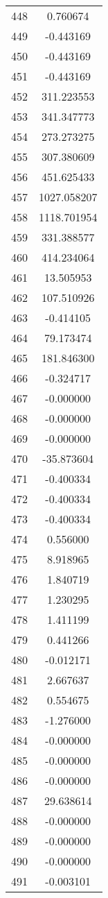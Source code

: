 \documentclass[12pt]{article}
\begin{document}
\begin{longtable}{@{}cc@{}}
448 & 0.760674 \\
449 & -0.443169 \\
450 & -0.443169 \\
451 & -0.443169 \\
452 & 311.223553 \\
453 & 341.347773 \\
454 & 273.273275 \\
455 & 307.380609 \\
456 & 451.625433 \\
457 & 1027.058207 \\
458 & 1118.701954 \\
459 & 331.388577 \\
460 & 414.234064 \\
461 & 13.505953 \\
462 & 107.510926 \\
463 & -0.414105 \\
464 & 79.173474 \\
465 & 181.846300 \\
466 & -0.324717 \\
467 & -0.000000 \\
468 & -0.000000 \\
469 & -0.000000 \\
470 & -35.873604 \\
471 & -0.400334 \\
472 & -0.400334 \\
473 & -0.400334 \\
474 & 0.556000 \\
475 & 8.918965 \\
476 & 1.840719 \\
477 & 1.230295 \\
478 & 1.411199 \\
479 & 0.441266 \\
480 & -0.012171 \\
481 & 2.667637 \\
482 & 0.554675 \\
483 & -1.276000 \\
484 & -0.000000 \\
485 & -0.000000 \\
486 & -0.000000 \\
487 & 29.638614 \\
488 & -0.000000 \\
489 & -0.000000 \\
490 & -0.000000 \\
491 & -0.003101 \\

\end{longtable}
\end{document}
